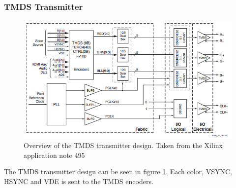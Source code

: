 \subsubsection{TMDS Transmitter}
\begin{figure}[h!]
    \centering
    \includegraphics[width=\linewidth]{img/TMDStransmitterdesign.png}
    \caption{Overview of the TMDS transmitter design. Taken from the Xilinx application note 495\cite{xapp495}}
    \label{fig:TMDSTransmitter}
\end{figure}
The TMDS transmitter design can be seen in figure \ref{fig:TMDSTransmitter}.
Each color, VSYNC, HSYNC and VDE is sent to the TMDS encoders.

